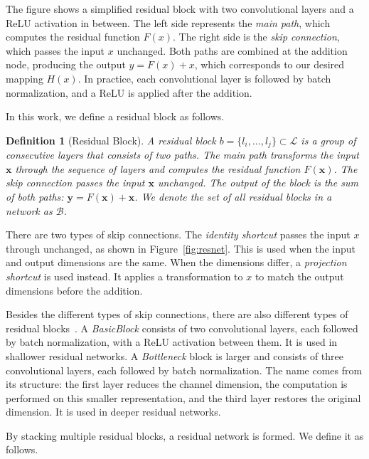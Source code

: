 \documentclass[
12pt,
fancyheadings,
a4paper,
twoside,
BCOR=0.7cm,
nobcorignoretitle,
grayscalebody,
]{stsreprt}
\newtheorem{definition}{Definition}[chapter]
\begin{document}
The figure shows a simplified residual block with two convolutional layers and a ReLU activation in
between. The left side represents the \textit{main path}, which computes the residual function
$F(x)$. The right side is the \textit{skip connection}, which passes the input $x$ unchanged. Both
paths are combined at the addition node, producing the output $y = F(x) + x$, which corresponds to
our desired mapping $H(x)$.
In practice, each convolutional layer is followed by batch normalization, and a ReLU is applied
after the addition.

In this work, we define a residual block as follows.

\begin{definition}[Residual Block]
\label{def:residual_block}
A residual block $b = \{l_i, \dots, l_j\} \subset \mathcal{L}$ is a group of consecutive layers
that consists of two paths.
The \textit{main path} transforms the input $\mathbf{x}$ through the sequence of layers and
computes the residual function $F(\mathbf{x})$.
The \textit{skip connection} passes the input $\mathbf{x}$ unchanged.
The output of the block is the sum of both paths: $\mathbf{y} = F(\mathbf{x}) + \mathbf{x}$.
We denote the set of all residual blocks in a network as $\mathcal{B}$.
\end{definition}

There are two types of skip connections.
The \textit{identity shortcut} passes the input $x$ through unchanged, as shown in
Figure~\ref{fig:resnet}. This is used when the input and output dimensions are the same.
When the dimensions differ, a \textit{projection shortcut} is used instead. It applies a
transformation to $x$ to match the output dimensions before the addition.

Besides the different types of skip connections, there are also different types of residual
blocks~\cite{he2016deep}.
A \textit{BasicBlock} consists of two convolutional layers, each followed by batch normalization,
with a ReLU activation between them. It is used in shallower residual networks.
A \textit{Bottleneck} block is larger and consists of three convolutional layers, each followed by
batch normalization. The name comes from its structure: the first layer reduces the channel
dimension, the computation is performed on this smaller representation, and the third layer
restores the original dimension. It is used in deeper residual networks.

By stacking multiple residual blocks, a residual network is formed. We define it as follows.
\end{document}
